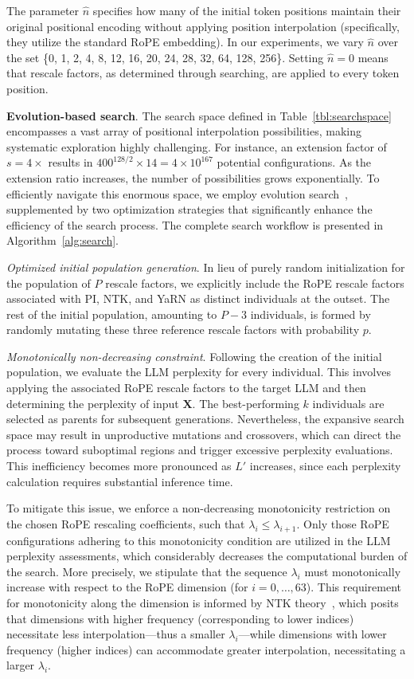 The parameter $\hat{n}$ specifies how many of the initial token positions maintain their original positional encoding without applying position interpolation (specifically, they utilize the standard RoPE embedding). In our experiments, we vary $\hat{n}$ over the set \{0, 1, 2, 4, 8, 12, 16, 20, 24, 28, 32, 64, 128, 256\}. Setting $\hat{n}=0$ means that rescale factors, as determined through searching, are applied to every token position.

\textbf{Evolution-based search}. The search space defined in Table~\ref{tbl:searchspace} encompasses a vast array of positional interpolation possibilities, making systematic exploration highly challenging. For instance, an extension factor of $s=4\times$ results in $400^{128/2}\times14=4\times10^{167}$ potential configurations. As the extension ratio increases, the number of possibilities grows exponentially. To efficiently navigate this enormous space, we employ evolution search~\cite{guo2020single}, supplemented by two optimization strategies that significantly enhance the efficiency of the search process. The complete search workflow is presented in Algorithm~\ref{alg:search}.

\textit{Optimized initial population generation}. In lieu of purely random initialization for the population of $P$ rescale factors, we explicitly include the RoPE rescale factors associated with PI, NTK, and YaRN as distinct individuals at the outset. The rest of the initial population, amounting to $P-3$ individuals, is formed by randomly mutating these three reference rescale factors with probability $p$.

\textit{Monotonically non-decreasing constraint}. Following the creation of the initial population, we evaluate the LLM perplexity for every individual. This involves applying the associated RoPE rescale factors to the target LLM and then determining the perplexity of input $\mathbf{X}$. The best-performing $k$ individuals are selected as parents for subsequent generations. Nevertheless, the expansive search space may result in unproductive mutations and crossovers, which can direct the process toward suboptimal regions and trigger excessive perplexity evaluations. This inefficiency becomes more pronounced as $L'$ increases, since each perplexity calculation requires substantial inference time.

To mitigate this issue, we enforce a non-decreasing monotonicity restriction on the chosen RoPE rescaling coefficients, such that $\lambda_i\le \lambda_{i+1}$. Only those RoPE configurations adhering to this monotonicity condition are utilized in the LLM perplexity assessments, which considerably decreases the computational burden of the search. More precisely, we stipulate that the sequence $\lambda_i$ must monotonically increase with respect to the RoPE dimension (for $i = 0, \ldots, 63$). This requirement for monotonicity along the dimension is informed by NTK theory~\cite{jacot2018neural,tancik2020fourier,ntk}, which posits that dimensions with higher frequency (corresponding to lower indices) necessitate less interpolation—thus a smaller $\lambda_i$—while dimensions with lower frequency (higher indices) can accommodate greater interpolation, necessitating a larger $\lambda_i$.

